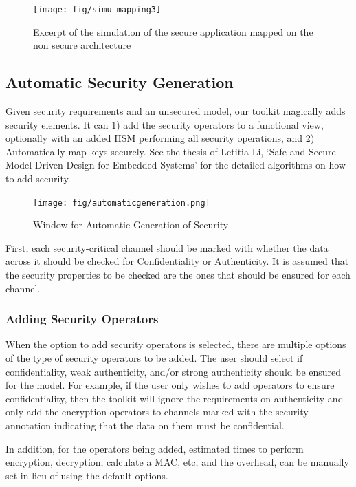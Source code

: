 \documentclass[12pt]{article}
\begin{document}
\begin{figure}[htbp]
\centering
\texttt{[image: fig/simu\_mapping3]}
\caption{Excerpt of the simulation of the secure application mapped on the non secure architecture} \label{fig:simu_mapping3}
\end{figure}

\subsection{Automatic Security Generation}

Given security requirements and an unsecured model, our toolkit magically adds security elements. It can 1) add the security operators to a functional view, optionally with an added HSM performing all security operations, and 2) Automatically map keys securely. See the thesis of Letitia Li, `Safe and Secure Model-Driven Design for Embedded Systems' for the detailed algorithms on how to add security.

\begin{figure}[htbp]
\centering
\texttt{[image: fig/automaticgeneration.png]}
\caption{Window for Automatic Generation of Security} \label{fig:autogen}
\end{figure}

First, each security-critical channel should be marked with whether the data across it should be checked for Confidentiality or Authenticity. It is assumed that the security properties to be checked are the ones that should be ensured for each channel.

\subsubsection{Adding Security Operators}

When the option to add security operators is selected, there are multiple options of the type of security operators to be added. The user should select if confidentiality, weak authenticity, and/or strong authenticity should be ensured for the model. For example, if the user only wishes to add operators to ensure confidentiality, then the toolkit will ignore the requirements on authenticity and only add the encryption operators to channels marked with the security annotation indicating that the data on them must be confidential.

  In addition, for the operators being added, estimated times to perform encryption, decryption, calculate a MAC, etc, and the overhead, can be manually set in lieu of using the default options. 
\end{document}
